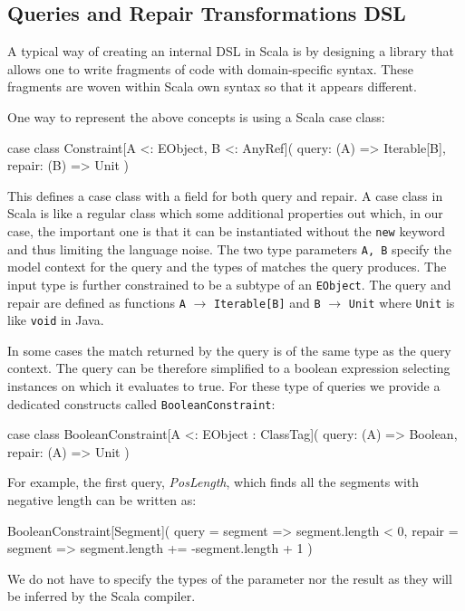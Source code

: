 \subsection{Queries and Repair Transformations DSL}

A typical way of creating an internal DSL in Scala is by designing a library that allows one to write fragments of code with domain-specific syntax.
These fragments are woven within Scala own syntax so that it appears different.

One way to represent the above concepts is using a Scala case class:
%
\begin{scalacode}
case class Constraint[A <: EObject, B <: AnyRef](
  query: (A) => Iterable[B],
  repair: (B) => Unit
)
\end{scalacode}
%
This defines a case class with a field for both query and repair.
A case class in Scala is like a regular class which some additional properties out which, in our case, the important one is that it can be instantiated without the \texttt{new} keyword and thus limiting the language noise.
The two type parameters \texttt{A, B} specify the model context for the query and the types of matches the query produces.
The input type is further constrained to be a subtype of an \texttt{EObject}.
The query and repair are defined as functions \texttt{A} $\rightarrow$ \texttt{Iterable[B]} and \texttt{B} $\rightarrow$ \texttt{Unit} where \texttt{Unit} is like \texttt{void} in Java.

In some cases the match returned by the query is of the same type as the query context.
The query can be therefore simplified to a boolean expression selecting instances on which it evaluates to true.
For these type of queries we provide a dedicated constructs called \texttt{BooleanConstraint}:
%
\begin{scalacode}
case class BooleanConstraint[A <: EObject : ClassTag](
  query: (A) => Boolean, 
  repair: (A) => Unit
)
\end{scalacode}

For example, the first query, \emph{PosLength}, which finds all the segments with negative length can be written as:
%
\begin{scalacode}
BooleanConstraint[Segment](
  query = segment => segment.length < 0,
  repair = segment => segment.length += -segment.length + 1
)
\end{scalacode}
%
We do not have to specify the types of the parameter nor the result as they will be inferred by the Scala compiler.

